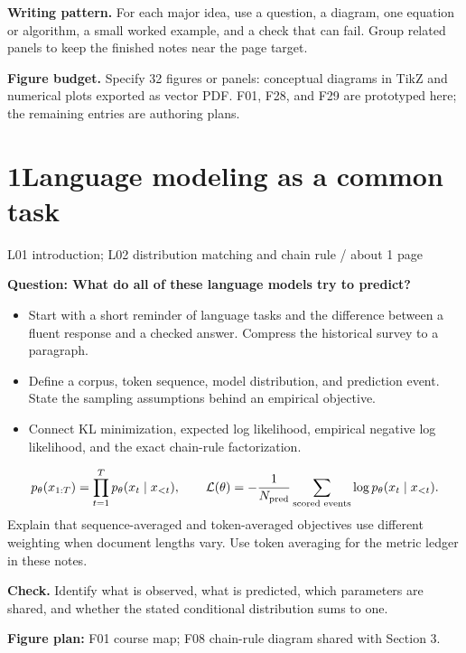 \documentclass[11pt,a4paper]{article}
\newcommand{\sectionplan}[3]{%
  \section{\texorpdfstring{#1\quad #2}{#1 #2}}
  {\small\color{muted}#3\par}}
\newcommand{\tagline}[1]{\textcolor{courseblue}{\textbf{#1}}}
\newcommand{\figids}[1]{\textcolor{courseteal}{\textbf{Figure plan:} #1}}
\begin{document}
\textbf{Writing pattern.} For each major idea, use a question, a diagram,
one equation or algorithm, a small worked example, and a check that can fail.
Group related panels to keep the finished notes near the page target.

\textbf{Figure budget.} Specify 32 figures or panels: conceptual diagrams in
TikZ and numerical plots exported as vector PDF. F01, F28, and F29 are prototyped
here; the remaining entries are authoring plans.

\clearpage
\sectionplan{1}{Language modeling as a common task}{L01 introduction; L02 distribution matching and chain rule \quad / \quad about 1 page}
\tagline{Question: What do all of these language models try to predict?}
\begin{itemize}
  \item Start with a short reminder of language tasks and the difference
  between a fluent response and a checked answer. Compress the historical
  survey to a paragraph.
  \item Define a corpus, token sequence, model distribution, and prediction
  event. State the sampling assumptions behind an empirical objective.
  \item Connect KL minimization, expected log likelihood, empirical
  negative log likelihood, and the exact chain-rule factorization.
\end{itemize}
\[
p_\theta(x_{1:T})=\prod_{t=1}^{T}p_\theta(x_t\mid x_{<t}),
\qquad
\mathcal L(\theta)=-\frac{1}{N_{\rm pred}}
\sum_{\text{scored events}}\log p_\theta(x_t\mid x_{<t}).
\]
Explain that sequence-averaged and token-averaged objectives use different
weighting when document lengths vary. Use token averaging for the metric
ledger in these notes.

\textbf{Check.} Identify what is observed, what is predicted, which parameters
are shared, and whether the stated conditional distribution sums to one.

\figids{F01 course map; F08 chain-rule diagram shared with Section 3.}
\end{document}
